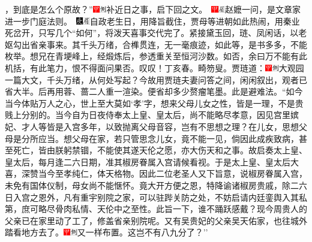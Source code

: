 ，到底是怎么个原故？''{\includegraphics[width=3mm]{../Images/00002}\includegraphics[width=3mm]{../Images/00011}\footnotesize \kaishu 补近日之事，启下回之文。　\includegraphics[width=3mm]{../Images/00002}\includegraphics[width=3mm]{../Images/00010}\footnotesize \kaishu 赵嬷一问，是文章家进一步门庭法则。　\includegraphics[width=3mm]{../Images/00004}\includegraphics[width=3mm]{../Images/00010}\footnotesize \kaishu 自政老生日，用降旨截住，贾母等进朝如此热闹，用秦业死岔开，只写几个``如何''，将泼天喜事交代完了。紧接黛玉回，琏、凤闲话，以老妪勾出省亲事来。其千头万绪，合榫贯连，无一毫痕迹，如此等，是书多多，不能枚举。想兄在青埂峰上，经煅炼后，参透重关至恒河沙数。如否，余曰万不能有此机括，有此笔力，恨不得面问果否。叹叹！丁亥春。畸笏叟。}贾琏道：{\includegraphics[width=3mm]{../Images/00002}\includegraphics[width=3mm]{../Images/00011}\footnotesize \kaishu 大观园一篇大文，千头万绪，从何处写起？今故用贾琏夫妻问答之间，闲闲叙出，观者已省大半。后再用蓉、蔷二人重一渲染。便省却多少赘瘤笔墨。此是避难法。}``如今当今体贴万人之心，世上至大莫如`孝'字，想来父母儿女之性，皆是一理，不是贵贱上分别的。当今自为日夜侍奉太上皇、皇太后，尚不能略尽孝意，因见宫里嫔妃、才人等皆是入宫多年，以致抛离父母音容，岂有不思想之理？在儿女，思想父母是分所应当。想父母在家，若只管思念儿女，竟不能一见，倘因此成疾致病，甚至死亡，皆由朕躬禁锢，不能使其遂天伦之愿，亦大伤天和之事。故启奏太上皇、皇太后，每月逢二六日期，准其椒房眷属入宫请候看视。于是太上皇、皇太后大喜，深赞当今至孝纯仁，体天格物。因此二位老圣人又下旨意，说椒房眷属入宫，未免有国体仪制，母女尚不能惬怀。竟大开方便之恩，特降谕诸椒房贵戚，除二六日入宫之恩外，凡有重宇别院之家，可以驻跸关防之处，不妨启请内廷銮舆入其私第，庶可略尽骨肉私情、天伦中之至性。此旨一下，谁不踊跃感戴？现今周贵人的父亲已在家里动了工了，修盖省亲别院呢。又有吴贵妃的父亲吴天佑家，也往城外踏看地方去了。{\includegraphics[width=3mm]{../Images/00002}\includegraphics[width=3mm]{../Images/00011}\footnotesize \kaishu 又一样布置。}这岂不有八九分了？''

